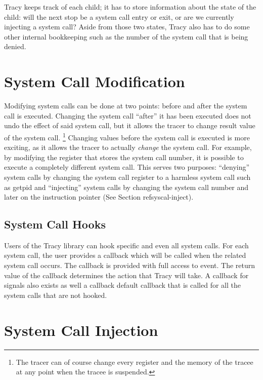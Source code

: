 \documentclass[a4paper, 10pt]{report}
\begin{document}
Tracy keeps track of each child; it has to store information about the state
of the child: will the next stop be a system call entry or exit, or are we
currently injecting a system call? Aside from those two states, Tracy also
has to do some other internal bookkeeping such as the number of the system
call that is being denied.


\section{System Call Modification}

Modifying system calls can be done at two points: before and after the
system call is executed. Changing the system call ``after'' it has been executed
does not undo the effect of said system call, but it allows the tracer to change
result value of the system call.
\footnote{The tracer can of course change every register and the memory of the
tracee at any point when the tracee is suspended.}
Changing values before the system call is executed is more exciting, as it
allows the tracer to actually \textit{change} the system call. For example, by
modifying the register that stores the system call number, it is possible to
execute a completely different system call. This serves two purposes:
``denying'' system calls by changing the system call register to a harmless
system call such as getpid and ``injecting'' system calls by changing the
system call number and later on the instruction pointer (See Section
ref{syscal-inject}).

\subsection{System Call Hooks}

Users of the Tracy library can hook specific and even all system calls. For
each system call, the user provides a callback which will be called when
the related system call occurs. The callback is provided with full access to
event. The return value of the callback determines the action that Tracy
will take. A callback for signals also exists as well a callback default
callback that is called for all the system calls that are not hooked.

\section{System Call Injection}
\label{syscall-inject}
\end{document}
